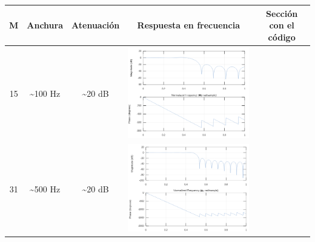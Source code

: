 \documentclass[11pt,a4paper]{article}
\begin{document}
\begin{table}[H]
\begin{tabular}{|c|c|c|c|c|}
\hline
M  & Anchura & Atenuación & Respuesta en frecuencia & Sección con el código \\ \hline
15 & \textasciitilde{}100 Hz            & \textasciitilde{}20 dB                       & \includegraphics[scale=0.3]{img/3.png} &  \color{deepred}\nameref{code2}\color{black} \\ \hline
31 & \textasciitilde{}500 Hz            & \textasciitilde{}20 dB                       & \includegraphics[scale=0.3]{img/4.png} & \color{deepred}\nameref{code3}\color{black} \\ \hline

\end{tabular}
\end{table}
\end{document}
